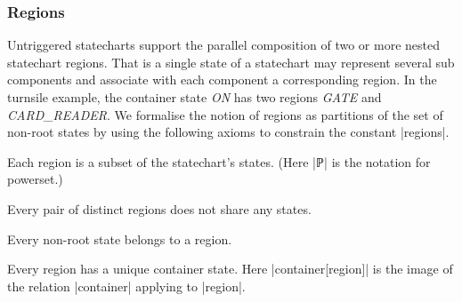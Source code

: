 \subsubsection{Regions} Untriggered statecharts support the parallel composition of two or more nested statechart regions. 
That is a single state of a statechart may represent several sub components and associate with each component a corresponding region.
In the turnsile example, the container state \emph{ON} has two regions \emph{GATE} and \emph{CARD\_READER}. 
We formalise the notion of regions as partitions of the set of non-root states by using the following axioms to constrain the constant |regions|.

\begin{axiom}
\label{axm:@region_type}
Each region is a subset of the statechart's states. (Here |ℙ| is the notation for powerset.)
    \begin{center}
    \end{center}
\end{axiom}
\begin{axiom}
\label{axm:@region_disjoint}
Every pair of distinct regions does not share any states.
    \begin{center}
    \end{center}    
\end{axiom}
\begin{axiom}
\label{axm:@region_complete}
Every non-root state belongs to a region.
    \begin{center}
    \end{center}
\end{axiom}
\begin{axiom}
\label{axm:@region_same_parent}
Every region has a unique container state. Here |container[region]| is the image of the relation |container| applying to |region|.
    \begin{center}
        \\
    \end{center}
\end{axiom}

